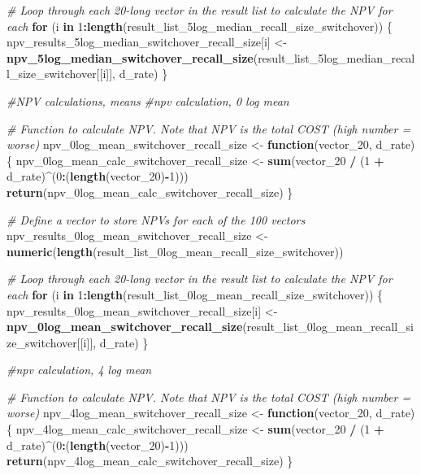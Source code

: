 \documentclass[
]{article}
\newenvironment{Shaded}{\begin{snugshade}}{\end{snugshade}}
\newcommand{\CommentTok}[1]{\textcolor[rgb]{0.56,0.35,0.01}{\textit{#1}}}
\newcommand{\ControlFlowTok}[1]{\textcolor[rgb]{0.13,0.29,0.53}{\textbf{#1}}}
\newcommand{\DecValTok}[1]{\textcolor[rgb]{0.00,0.00,0.81}{#1}}
\newcommand{\FunctionTok}[1]{\textcolor[rgb]{0.13,0.29,0.53}{\textbf{#1}}}
\newcommand{\NormalTok}[1]{#1}
\newcommand{\OtherTok}[1]{\textcolor[rgb]{0.56,0.35,0.01}{#1}}
\newcommand{\SpecialCharTok}[1]{\textcolor[rgb]{0.81,0.36,0.00}{\textbf{#1}}}
\begin{document}
\begin{Shaded}
\begin{Highlighting}[]
\CommentTok{\# Loop through each 20{-}long vector in the result list to calculate the NPV for each}
\ControlFlowTok{for}\NormalTok{ (i }\ControlFlowTok{in} \DecValTok{1}\SpecialCharTok{:}\FunctionTok{length}\NormalTok{(result\_list\_5log\_median\_recall\_size\_switchover)) \{}
\NormalTok{  npv\_results\_5log\_median\_switchover\_recall\_size[i] }\OtherTok{\textless{}{-}} \FunctionTok{npv\_5log\_median\_switchover\_recall\_size}\NormalTok{(result\_list\_5log\_median\_recall\_size\_switchover[[i]], d\_rate)}
\NormalTok{\}}


\CommentTok{\#NPV calculations, means}
\CommentTok{\#npv calculation, 0 log mean}

\CommentTok{\# Function to calculate NPV. Note that NPV is the total COST (high number = worse)}
\NormalTok{npv\_0log\_mean\_switchover\_recall\_size }\OtherTok{\textless{}{-}} \ControlFlowTok{function}\NormalTok{(vector\_20, d\_rate) \{}
\NormalTok{  npv\_0log\_mean\_calc\_switchover\_recall\_size }\OtherTok{\textless{}{-}} \FunctionTok{sum}\NormalTok{(vector\_20 }\SpecialCharTok{/}\NormalTok{ (}\DecValTok{1} \SpecialCharTok{+}\NormalTok{ d\_rate)}\SpecialCharTok{\^{}}\NormalTok{(}\DecValTok{0}\SpecialCharTok{:}\NormalTok{(}\FunctionTok{length}\NormalTok{(vector\_20)}\SpecialCharTok{{-}}\DecValTok{1}\NormalTok{)))}
  \FunctionTok{return}\NormalTok{(npv\_0log\_mean\_calc\_switchover\_recall\_size)}
\NormalTok{\}}

\CommentTok{\# Define a vector to store NPVs for each of the 100 vectors}
\NormalTok{npv\_results\_0log\_mean\_switchover\_recall\_size }\OtherTok{\textless{}{-}} \FunctionTok{numeric}\NormalTok{(}\FunctionTok{length}\NormalTok{(result\_list\_0log\_mean\_recall\_size\_switchover))}

\CommentTok{\# Loop through each 20{-}long vector in the result list to calculate the NPV for each}
\ControlFlowTok{for}\NormalTok{ (i }\ControlFlowTok{in} \DecValTok{1}\SpecialCharTok{:}\FunctionTok{length}\NormalTok{(result\_list\_0log\_mean\_recall\_size\_switchover)) \{}
\NormalTok{  npv\_results\_0log\_mean\_switchover\_recall\_size[i] }\OtherTok{\textless{}{-}} \FunctionTok{npv\_0log\_mean\_switchover\_recall\_size}\NormalTok{(result\_list\_0log\_mean\_recall\_size\_switchover[[i]], d\_rate)}
\NormalTok{\}}


\CommentTok{\#npv calculation, 4 log mean}

\CommentTok{\# Function to calculate NPV. Note that NPV is the total COST (high number = worse)}
\NormalTok{npv\_4log\_mean\_switchover\_recall\_size }\OtherTok{\textless{}{-}} \ControlFlowTok{function}\NormalTok{(vector\_20, d\_rate) \{}
\NormalTok{  npv\_4log\_mean\_calc\_switchover\_recall\_size }\OtherTok{\textless{}{-}} \FunctionTok{sum}\NormalTok{(vector\_20 }\SpecialCharTok{/}\NormalTok{ (}\DecValTok{1} \SpecialCharTok{+}\NormalTok{ d\_rate)}\SpecialCharTok{\^{}}\NormalTok{(}\DecValTok{0}\SpecialCharTok{:}\NormalTok{(}\FunctionTok{length}\NormalTok{(vector\_20)}\SpecialCharTok{{-}}\DecValTok{1}\NormalTok{)))}
  \FunctionTok{return}\NormalTok{(npv\_4log\_mean\_calc\_switchover\_recall\_size)}
\NormalTok{\}}


\end{Highlighting}
\end{Shaded}
\end{document}
